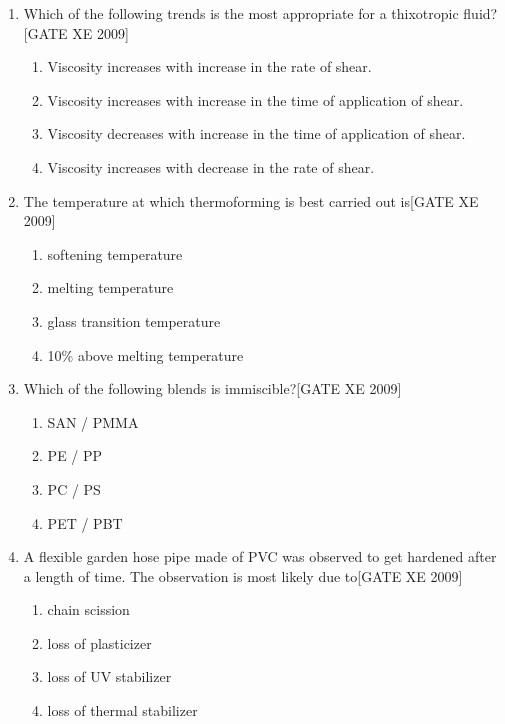 \documentclass[journal,12pt,onecolumn]{IEEEtran}
\theoremstyle{remark}
\begin{document}
\begin{enumerate}[label=\textbf{Q.\arabic*.},  wide=0pt, leftmargin=*]

    \item Which of the following trends is the most appropriate for a thixotropic fluid?\hfill[GATE XE 2009]
    \begin{multicols}{2}
    \begin{enumerate}
        \item Viscosity increases with increase in the rate of shear. 
        \item Viscosity increases with increase in the time of application of shear. 
        \item Viscosity decreases with increase in the time of application of shear. 
        \item Viscosity increases with decrease in the rate of shear.
    \end{enumerate}
    \end{multicols}

   \item The temperature at which thermoforming is best carried out is\hfill[GATE XE 2009]
   \begin{multicols}{2}
    \begin{enumerate}
        \item softening temperature 
        \item melting temperature 
        \item glass transition temperature 
        \item 10\% above melting temperature
    \end{enumerate}
    \end{multicols}

    \item  Which of the following blends is immiscible?\hfill[GATE XE 2009]
    \begin{multicols}{2}
    \begin{enumerate}
        \item SAN / PMMA 
        \item PE / PP 
        \item PC / PS 
        \item PET / PBT
    \end{enumerate}
    \end{multicols}

   \item A flexible garden hose pipe made of PVC was observed to get hardened after a length of time. The observation is most likely due to\hfill[GATE XE 2009]
   \begin{multicols}{2}
    \begin{enumerate}
        \item chain scission 
        \item loss of plasticizer 
        \item loss of UV stabilizer 
        \item loss of thermal stabilizer
    \end{enumerate}
    \end{multicols}


\end{enumerate}
\end{document}
